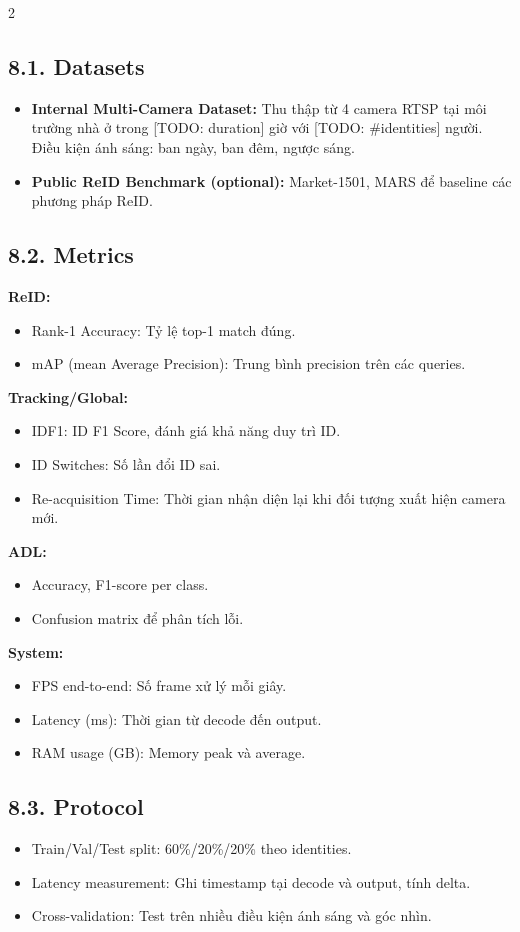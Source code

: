 \documentclass[a4paper,13pt]{article}
\begin{document}
\begin{multicols}{2}
\subsection*{8.1. Datasets}
\begin{itemize}
    \item \textbf{Internal Multi-Camera Dataset:} Thu thập từ 4 camera RTSP tại môi trường nhà ở trong [TODO: duration] giờ với [TODO: \#identities] người. Điều kiện ánh sáng: ban ngày, ban đêm, ngược sáng.
    \item \textbf{Public ReID Benchmark (optional):} Market-1501, MARS để baseline các phương pháp ReID.
\end{itemize}

\subsection*{8.2. Metrics}
\textbf{ReID:}
\begin{itemize}
    \item Rank-1 Accuracy: Tỷ lệ top-1 match đúng.
    \item mAP (mean Average Precision): Trung bình precision trên các queries.
\end{itemize}

\textbf{Tracking/Global:}
\begin{itemize}
    \item IDF1: ID F1 Score, đánh giá khả năng duy trì ID.
    \item ID Switches: Số lần đổi ID sai.
    \item Re-acquisition Time: Thời gian nhận diện lại khi đối tượng xuất hiện camera mới.
\end{itemize}

\textbf{ADL:}
\begin{itemize}
    \item Accuracy, F1-score per class.
    \item Confusion matrix để phân tích lỗi.
\end{itemize}

\textbf{System:}
\begin{itemize}
    \item FPS end-to-end: Số frame xử lý mỗi giây.
    \item Latency (ms): Thời gian từ decode đến output.
    \item RAM usage (GB): Memory peak và average.
\end{itemize}

\subsection*{8.3. Protocol}
\begin{itemize}
    \item Train/Val/Test split: 60\%/20\%/20\% theo identities.
    \item Latency measurement: Ghi timestamp tại decode và output, tính delta.
    \item Cross-validation: Test trên nhiều điều kiện ánh sáng và góc nhìn.
\end{itemize}


\end{multicols}
\end{document}

